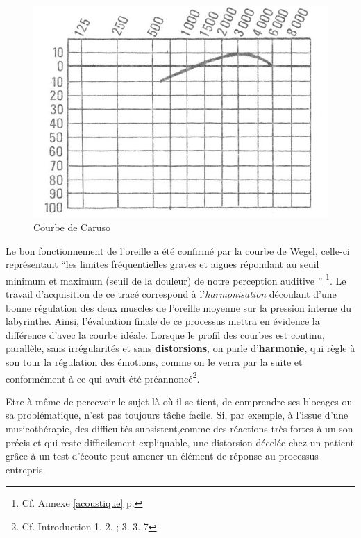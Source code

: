 \begin{center}
\begin{figure}
	\includegraphics[width=1.0\linewidth]{images/graphiques/courbecarusoideale}	
	\caption{Courbe de Caruso}
\end{figure}	
\end{center}




Le bon fonctionnement de l'oreille a été confirmé par la courbe
de Wegel, celle-ci représentant   \enquote {les limites fréquentielles graves et aigues répondant au seuil 
minimum et maximum (seuil de la douleur) de notre perception auditive } 
\autocite{Tomatislangage}\footnote{Cf. Annexe \ref{acoustique} p. \pageref{acoustique}}.
 Le travail d'acquisition de ce tracé correspond à l'\textsl{harmonisation}
découlant d'une bonne régulation des deux muscles de l'oreille moyenne
sur la pression interne du
labyrinthe.
Ainsi, l'évaluation finale de ce processus mettra en évidence la différence
d'avec la courbe idéale.
Lorsque le profil des
courbes est continu, parallèle, sans irrégularités et sans
\textbf{distorsions}, on parle d'\textbf{harmonie}, qui règle à son tour
la régulation des émotions, comme on le verra par la suite et conformément à
ce qui avait été préannoncé\footnote{Cf. Introduction 1. 2. ; 3. 3. 7}.

Etre à même de percevoir le sujet là où il se tient, de comprendre ses blocages ou sa problématique, n'est pas toujours tâche facile.
Si, par exemple, à l'issue d'une musicothérapie, des difficultés subsistent,comme des réactions très fortes à un son précis et qui reste difficilement expliquable,  une distorsion décelée chez un patient grâce à un test d'écoute peut amener un élément de réponse au processus entrepris.

